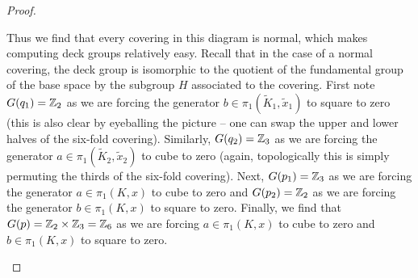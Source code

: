 \documentclass{../mathnotes}
\begin{document}
\begin{proof}
\begin{enumerate}[(a)]
            Thus we find that every covering in this diagram is normal, which makes computing
            deck groups relatively easy. Recall that in the case of a normal covering, the deck group is
            isomorphic to the quotient of the fundamental group of the base space by the subgroup $H$ associated
            to the covering. First note $G(q_1)=\mathbb{Z}_2$ as we are forcing the generator $b\in\pi_1(\tilde K_1,\tilde x_1)$
            to square to zero (this is also clear by eyeballing the picture -- one can swap the upper and lower halves of
            the six-fold covering). Similarly, $G(q_2)=\mathbb{Z}_3$ as we are forcing the generator $a\in\pi_1(\tilde K_2,\tilde x_2)$
            to cube to zero (again, topologically this is simply permuting the thirds of the six-fold covering).
            Next, $G(p_1)=\mathbb{Z}_3$ as we are forcing the generator $a\in\pi_1(K,x)$ to cube to zero and $G(p_2)=\mathbb{Z}_2$
            as we are forcing the generator $b\in\pi_1(K,x)$ to square to zero. Finally, we find that $G(p)=\mathbb{Z}_2\times \mathbb{Z}_3=\mathbb{Z}_6$
            as we are forcing $a\in\pi_1(K,x)$ to cube to zero and $b\in\pi_1(K,x)$ to square to zero.
    \end{enumerate}
\end{proof}
\end{document}
